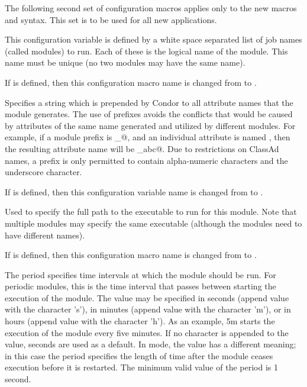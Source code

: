 The following 
second set of configuration macros applies only to the new
macros and syntax.
This set is to be used for all new applications.
\begin{description}

\label{param:StartdCronJobList}
\item[\Macro{STARTD\_CRON\_JOBLIST}]
  This configuration variable is defined by a white space separated
  list of job names (called modules) to run.
  Each of these is the logical name of the module.  This name
  must be unique (no two modules may have the same name).

  If 
  is defined, then this configuration macro name is changed from
   to
  .

\label{param:StartdCronModulePrefix}
\item[\Macro{STARTD\_CRON\_<ModuleName>\_PREFIX}]
  Specifies a string which is prepended by
  Condor to all attribute names that the module generates.
  The use of prefixes avoids the conflicts that would be caused by
  attributes of the same name generated and utilized by different
  modules.
  For example, if a module prefix is \verb@xyz_@,
  and an individual attribute is named \verb@abc@,
  then the resulting attribute name will be \verb@xyz_abc@.
  Due to restrictions on ClassAd names, a prefix is only permitted to contain
  alpha-numeric characters and the underscore character.

  If  is defined,
  then this configuration variable name is changed from
   to
  .

\label{param:StartdCronModuleExecutable}
\item[\Macro{STARTD\_CRON\_<ModuleName>\_EXECUTABLE}]
  Used to specify the full path to the
  executable to run for this module.  Note that multiple modules may
  specify the same executable (although the modules need to have different
  names).

  If 
  is defined, then this configuration macro name is changed from
   to
  .

\label{param:StartdCronModulePeriod}
\item[\Macro{STARTD\_CRON\_<ModuleName>\_PERIOD}]
  The period specifies time intervals at which the module should be run.
  For periodic modules, this
  is the time interval that passes between starting the execution
  of the module.
  The value may be specified in seconds (append value with the
  character 's'), in minutes (append value with the character 'm'),
  or in hours (append value with the character 'h').
  As an example, 5m starts the execution of the module every five minutes.
  If no character is appended to the value, seconds are used as a default.
  In  mode, the value has a different meaning; in
  this case 
  the period specifies the length of time after the module ceases execution
  before it is restarted.
  The minimum valid value of the period is 1 second.


\end{description}
